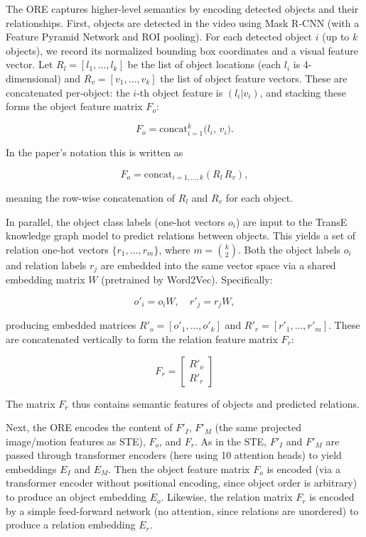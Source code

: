 The ORE captures higher-level semantics by encoding detected objects and their relationships. First, objects are detected in the video using Mask R-CNN (with a Feature Pyramid Network and ROI pooling). For each detected object $i$ (up to $k$ objects), we record its normalized bounding box coordinates and a visual feature vector. Let $R_l=[l_1,\dots,l_k]$ be the list of object locations (each $l_i$ is 4-dimensional) and $R_v=[v_1,\dots,v_k]$ the list of object feature vectors. These are concatenated per-object: the $i$-th object feature is $(l_i|v_i)$, and stacking these forms the object feature matrix $F_o$:

$$
F_o = \mathrm{concat}_{i=1}^k\bigl(l_i,\,v_i\bigr).
$$

In the paper's notation this is written as

$$
F_o = \mathrm{concat}_{i=1,\dots,k}(R_l\,R_v),
$$

meaning the row-wise concatenation of $R_l$ and $R_v$ for each object.

In parallel, the object class labels (one-hot vectors $o_i$) are input to the TransE knowledge graph model to predict relations between objects. This yields a set of relation one-hot vectors $\{r_1,\dots,r_{m}\}$, where $m=\binom{k}{2}$. Both the object labels $o_i$ and relation labels $r_j$ are embedded into the same vector space via a shared embedding matrix $W$ (pretrained by Word2Vec). Specifically:

$$
o'_i = o_i W,\quad r'_j = r_j W,
$$

producing embedded matrices $R'_o=[o'_1,\dots,o'_k]$ and $R'_r=[r'_1,\dots,r'_m]$. These are concatenated vertically to form the relation feature matrix $F_r$:

$$
F_r = \begin{bmatrix}R'_o \\ R'_r\end{bmatrix}
$$

The matrix $F_r$ thus contains semantic features of objects and predicted relations.

Next, the ORE encodes the content of $F'_I$, $F'_M$ (the same projected image/motion features as STE), $F_o$, and $F_r$. As in the STE, $F'_I$ and $F'_M$ are passed through transformer encoders (here using 10 attention heads) to yield embeddings $E_I$ and $E_M$. Then the object feature matrix $F_o$ is encoded (via a transformer encoder without positional encoding, since object order is arbitrary) to produce an object embedding $E_o$. Likewise, the relation matrix $F_r$ is encoded by a simple feed-forward network (no attention, since relations are unordered) to produce a relation embedding $E_r$.

